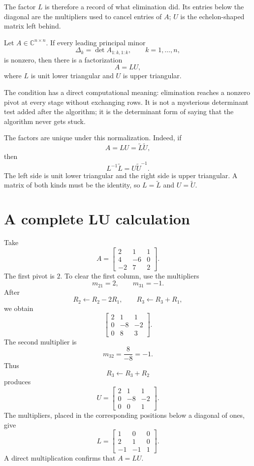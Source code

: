 The factor \(L\) is therefore a record of what elimination did.  Its entries below the diagonal are the multipliers used to cancel entries of \(A\); \(U\) is the echelon-shaped matrix left behind.

\begin{proposition}
Let \(A\in\mathbb C^{n\times n}\).  If every leading principal minor
\[
  \Delta_k=\det A_{1:k,1:k},\qquad k=1,\ldots,n,
\]
is nonzero, then there is a factorization
\[
  A=LU,
\]
where \(L\) is unit lower triangular and \(U\) is upper triangular.
\end{proposition}

The condition has a direct computational meaning: elimination reaches a nonzero pivot at every stage without exchanging rows.  It is not a mysterious determinant test added after the algorithm; it is the determinant form of saying that the algorithm never gets stuck.

The factors are unique under this normalization.  Indeed, if
\[
  A=LU=\widetilde L\widetilde U,
\]
then
\[
  L^{-1}\widetilde L=U\widetilde U^{-1}.
\]
The left side is unit lower triangular and the right side is upper triangular.  A matrix of both kinds must be the identity, so \(L=\widetilde L\) and \(U=\widetilde U\).

\section{A complete LU calculation}

Take
\[
  A=
  \begin{bmatrix}
    2&1&1\\
    4&-6&0\\
    -2&7&2
  \end{bmatrix}.
\]
The first pivot is \(2\).  To clear the first column, use the multipliers
\[
  m_{21}=2,
  \qquad
  m_{31}=-1.
\]
After
\[
  R_2\leftarrow R_2-2R_1,
  \qquad
  R_3\leftarrow R_3+R_1,
\]
we obtain
\[
  \begin{bmatrix}
    2&1&1\\
    0&-8&-2\\
    0&8&3
  \end{bmatrix}.
\]
The second multiplier is
\[
  m_{32}=\frac{8}{-8}=-1.
\]
Thus
\[
  R_3\leftarrow R_3+R_2
\]
produces
\[
  U=
  \begin{bmatrix}
    2&1&1\\
    0&-8&-2\\
    0&0&1
  \end{bmatrix}.
\]
The multipliers, placed in the corresponding positions below a diagonal of ones, give
\[
  L=
  \begin{bmatrix}
    1&0&0\\
    2&1&0\\
    -1&-1&1
  \end{bmatrix}.
\]
A direct multiplication confirms that \(A=LU\).

